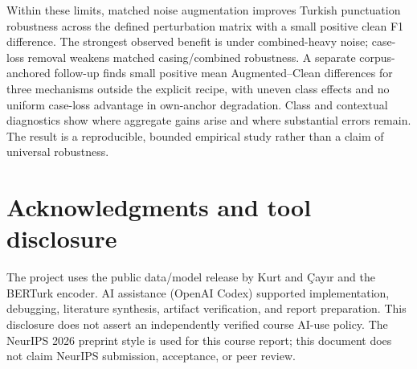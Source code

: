 \documentclass{article}
\begin{document}
Within these limits, matched noise augmentation improves Turkish punctuation
robustness across the defined perturbation matrix with a small positive clean
F1 difference. The strongest observed benefit is under combined-heavy noise;
case-loss removal weakens matched casing/combined robustness. A separate
corpus-anchored follow-up finds small positive mean Augmented--Clean differences
for three mechanisms outside the explicit recipe, with uneven class effects
and no uniform case-loss advantage in own-anchor degradation. Class and
contextual diagnostics show where aggregate gains arise and where substantial
errors remain. The result is a reproducible, bounded empirical study rather
than a claim of universal robustness.

\section*{Acknowledgments and tool disclosure}
The project uses the public data/model release by Kurt and \c{C}ay\i r and the
BERTurk encoder. AI assistance (OpenAI Codex) supported implementation,
debugging, literature synthesis, artifact verification, and report preparation.
This disclosure does not assert an independently verified course AI-use policy.
The NeurIPS 2026 preprint style is used for this course report; this document
does not claim NeurIPS submission, acceptance, or peer review.
\end{document}
